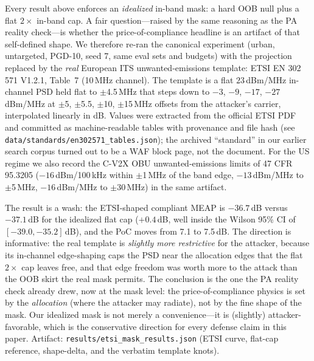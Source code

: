 \documentclass[review]{elsarticle}
\begin{document}
Every result above enforces an \emph{idealized} in-band mask: a hard OOB
null plus a flat $2\times$ in-band cap. A fair question---raised by the
same reasoning as the PA reality check---is whether the
price-of-compliance headline is an artifact of that self-defined shape.
We therefore re-ran the canonical experiment (urban, untargeted, PGD-10,
seed 7, same eval sets and budgets) with the projection replaced by the
\emph{real} European ITS unwanted-emissions template: ETSI EN 302 571
V1.2.1, Table~7 (10\,MHz channel). The template is a flat
$23$\,dBm/MHz in-channel PSD held flat to $\pm$4.5$\,$MHz that steps down
to $-3$, $-9$, $-17$, $-27$\,dBm/MHz at $\pm$5, $\pm$5.5, $\pm$10,
$\pm$15\,MHz offsets from the attacker's carrier, interpolated linearly
in dB. Values were extracted from the official ETSI PDF and committed as
machine-readable tables with provenance and file hash
(see \texttt{data/standards/en302571\_tables.json}); the archived
``standard'' in our earlier search corpus turned out to be a
WAF block page, not the document. For the US regime we also record the
C-V2X OBU unwanted-emissions limits of 47 CFR 95.3205
($-16$\,dBm/100\,kHz within $\pm$1\,MHz of the band edge,
$-13$\,dBm/MHz to $\pm$5\,MHz, $-16$\,dBm/MHz to $\pm$30\,MHz) in the
same artifact.

The result is a wash: the ETSI-shaped compliant MEAP is $-36.7$\,dB
versus $-37.1$\,dB for the idealized flat cap ($+0.4$\,dB, well inside
the Wilson 95\% CI of $[-39.0,-35.2]$\,dB), and the PoC moves from
7.1 to 7.5\,dB. The direction is informative: the real template is
\emph{slightly more restrictive} for the attacker, because its
in-channel edge-shaping caps the PSD near the allocation edges that the
flat $2\times$ cap leaves free, and that edge freedom was worth more to
the attack than the OOB skirt the real mask permits. The conclusion is
the one the PA reality check already drew, now at the mask level: the
price-of-compliance physics is set by the \emph{allocation} (where the
attacker may radiate), not by the fine shape of the mask. Our idealized
mask is not merely a convenience---it is (slightly) attacker-favorable,
which is the conservative direction for every defense claim in this
paper. Artifact: \texttt{results/etsi\_mask\_results.json} (ETSI curve,
flat-cap reference, shape-delta, and the verbatim template knots).
\end{document}
